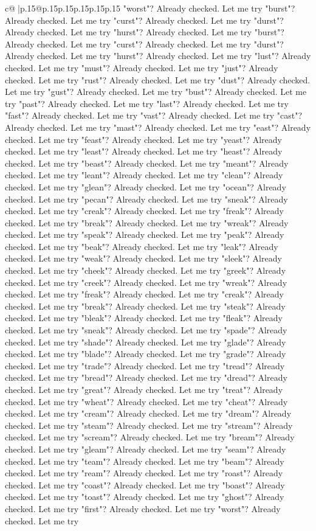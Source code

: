 \documentclass{article}
\begin{document}
{\begin{supertabular}{c@{$\;$}|p{.15\linewidth}@{}p{.15\linewidth}p{.15\linewidth}p{.15\linewidth}p{.15\linewidth}p{.15\linewidth}}
{{{"worst"? Already checked. Let me try "burst"? Already checked. Let me try "curst"? Already checked. Let me try "durst"? Already checked. Let me try "hurst"? Already checked. Let me try "burst"? Already checked. Let me try "curst"? Already checked. Let me try "durst"? Already checked. Let me try "hurst"? Already checked. Let me try "lust"? Already checked. Let me try "must"? Already checked. Let me try "just"? Already checked. Let me try "rust"? Already checked. Let me try "dust"? Already checked. Let me try "gust"? Already checked. Let me try "bust"? Already checked. Let me try "past"? Already checked. Let me try "last"? Already checked. Let me try "fast"? Already checked. Let me try "vast"? Already checked. Let me try "cast"? Already checked. Let me try "mast"? Already checked. Let me try "east"? Already checked. Let me try "feast"? Already checked. Let me try "yeast"? Already checked. Let me try "least"? Already checked. Let me try "heast"? Already checked. Let me try "beast"? Already checked. Let me try "meant"? Already checked. Let me try "leant"? Already checked. Let me try "clean"? Already checked. Let me try "glean"? Already checked. Let me try "ocean"? Already checked. Let me try "pecan"? Already checked. Let me try "sneak"? Already checked. Let me try "creak"? Already checked. Let me try "freak"? Already checked. Let me try "break"? Already checked. Let me try "wreak"? Already checked. Let me try "speak"? Already checked. Let me try "peak"? Already checked. Let me try "beak"? Already checked. Let me try "leak"? Already checked. Let me try "weak"? Already checked. Let me try "sleek"? Already checked. Let me try "cheek"? Already checked. Let me try "greek"? Already checked. Let me try "creek"? Already checked. Let me try "wreak"? Already checked. Let me try "freak"? Already checked. Let me try "creak"? Already checked. Let me try "break"? Already checked. Let me try "steak"? Already checked. Let me try "bleak"? Already checked. Let me try "fleak"? Already checked. Let me try "sneak"? Already checked. Let me try "spade"? Already checked. Let me try "shade"? Already checked. Let me try "glade"? Already checked. Let me try "blade"? Already checked. Let me try "grade"? Already checked. Let me try "trade"? Already checked. Let me try "tread"? Already checked. Let me try "bread"? Already checked. Let me try "dread"? Already checked. Let me try "great"? Already checked. Let me try "treat"? Already checked. Let me try "wheat"? Already checked. Let me try "cheat"? Already checked. Let me try "cream"? Already checked. Let me try "dream"? Already checked. Let me try "steam"? Already checked. Let me try "stream"? Already checked. Let me try "scream"? Already checked. Let me try "bream"? Already checked. Let me try "gleam"? Already checked. Let me try "seam"? Already checked. Let me try "team"? Already checked. Let me try "beam"? Already checked. Let me try "ream"? Already checked. Let me try "roast"? Already checked. Let me try "coast"? Already checked. Let me try "boast"? Already checked. Let me try "toast"? Already checked. Let me try "ghost"? Already checked. Let me try "first"? Already checked. Let me try "worst"? Already checked. Let me try }}}
\end{supertabular}}
\end{document}
